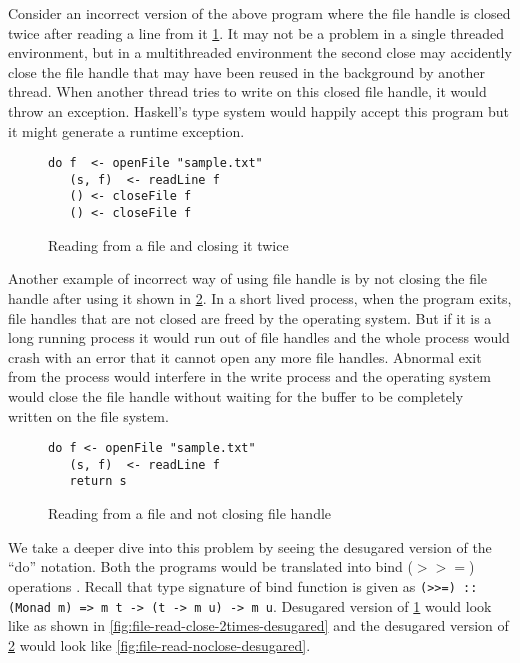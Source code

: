 Consider an incorrect version of the above program where the file handle is closed twice after reading a line from it \cref{fig:file-read-close-2times}.
It may not be a problem in a single threaded environment, but in a multithreaded environment
the second close may accidently close the file handle that may have been reused in the background by another thread.
When another thread tries to write on this closed file handle, it would throw an exception.
Haskell's type system would happily accept this program but it might generate a runtime exception.
\begin{figure}[h]
  \begin{framed}
    \begin{verbatim}
do f  <- openFile "sample.txt"
   (s, f)  <- readLine f
   () <- closeFile f
   () <- closeFile f
    \end{verbatim}
  \end{framed}
  \caption{Reading from a file and closing it twice}
  \label{fig:file-read-close-2times}
\end{figure}

Another example of incorrect way of using file handle is by not closing the file handle after using it shown in \cref{fig:file-read-noclose}.
In a short lived process, when the program exits, file handles that are not closed are freed by the operating system.
But if it is a long running process it would run out of file handles and the whole process would crash with an error that
it cannot open any more file handles. Abnormal exit from the process would interfere in the write process
and the operating system would close the file handle without waiting for the buffer to be completely
written on the file system.
\begin{figure}[h]
  \begin{framed}
    \begin{verbatim}
do f <- openFile "sample.txt"
   (s, f)  <- readLine f
   return s
    \end{verbatim}
  \end{framed}
  \caption{Reading from a file and not closing file handle}
  \label{fig:file-read-noclose}
\end{figure}
We take a deeper dive into this problem by seeing the desugared version of the ``do'' notation.
Both the programs would be translated into bind ($>>=$) operations . Recall that type signature of bind function is given as
\texttt{(>>=) :: (Monad m) => m t -> (t -> m u) -> m u}. Desugared version of \cref{fig:file-read-close-2times}
would look like as shown in \cref{fig:file-read-close-2times-desugared}
and the desugared version of \cref{fig:file-read-noclose} would look like \cref{fig:file-read-noclose-desugared}.

